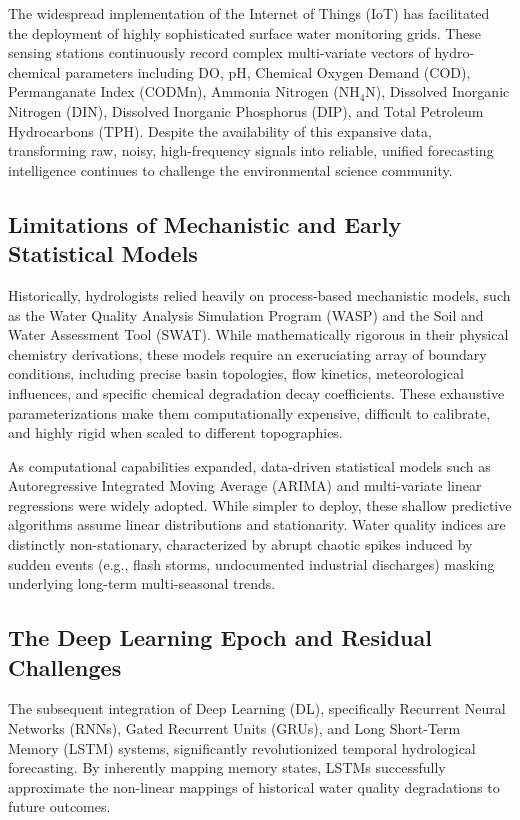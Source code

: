 \documentclass[journal,10pt,twocolumn]{IEEEtran}
\begin{document}
The widespread implementation of the Internet of Things (IoT) has facilitated the deployment of highly sophisticated surface water monitoring grids. These sensing stations continuously record complex multi-variate vectors of hydro-chemical parameters including DO, pH, Chemical Oxygen Demand (COD), Permanganate Index (CODMn), Ammonia Nitrogen ($\text{NH}_4\text{N}$), Dissolved Inorganic Nitrogen (DIN), Dissolved Inorganic Phosphorus (DIP), and Total Petroleum Hydrocarbons (TPH). Despite the availability of this expansive data, transforming raw, noisy, high-frequency signals into reliable, unified forecasting intelligence continues to challenge the environmental science community.

\subsection{Limitations of Mechanistic and Early Statistical Models}
Historically, hydrologists relied heavily on process-based mechanistic models, such as the Water Quality Analysis Simulation Program (WASP) and the Soil and Water Assessment Tool (SWAT). While mathematically rigorous in their physical chemistry derivations, these models require an excruciating array of boundary conditions, including precise basin topologies, flow kinetics, meteorological influences, and specific chemical degradation decay coefficients. These exhaustive parameterizations make them computationally expensive, difficult to calibrate, and highly rigid when scaled to different topographies.

As computational capabilities expanded, data-driven statistical models such as Autoregressive Integrated Moving Average (ARIMA) and multi-variate linear regressions were widely adopted. While simpler to deploy, these shallow predictive algorithms assume linear distributions and stationarity. Water quality indices are distinctly non-stationary, characterized by abrupt chaotic spikes induced by sudden events (e.g., flash storms, undocumented industrial discharges) masking underlying long-term multi-seasonal trends.

\subsection{The Deep Learning Epoch and Residual Challenges}
The subsequent integration of Deep Learning (DL), specifically Recurrent Neural Networks (RNNs), Gated Recurrent Units (GRUs), and Long Short-Term Memory (LSTM) systems, significantly revolutionized temporal hydrological forecasting. By inherently mapping memory states, LSTMs successfully approximate the non-linear mappings of historical water quality degradations to future outcomes. 
\end{document}
